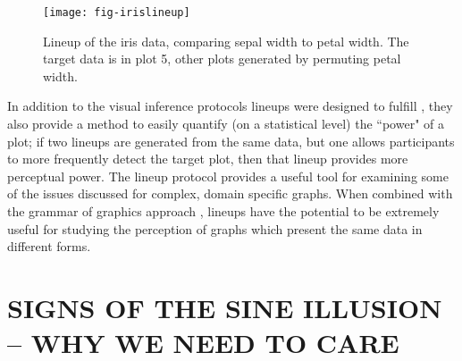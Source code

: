 \documentclass[11pt]{isuthesis}\usepackage[]{graphicx}\usepackage[]{color}
\begin{document}
\begin{figure}[htbp]\centering
\texttt{[image: fig-irislineup]}
\caption[Lineup for testing statistical graphics]{Lineup of the iris data, comparing sepal width to petal width. The target data is in plot 5, other plots generated by permuting petal width.}\label{fig:lineupexample}
\end{figure}
In addition to the visual inference protocols lineups were designed to fulfill \citep{buja2009statistical}, they also provide a method to easily quantify (on a statistical level) the ``power" of a plot; if two lineups are generated from the same data, but one allows participants to more frequently detect the target plot, then that lineup provides more perceptual power. The lineup protocol provides a useful tool for examining some of the issues discussed for complex, domain specific graphs. When combined with the grammar of graphics approach \citep{wickham2010graphical}, lineups have the potential to be extremely useful for studying the perception of graphs which present the same data in different forms.


\graphicspath{{Figure/sineIllusion/}{Images/sineIllusion/}}
\renewcommand{\floatpagefraction}{.99}

\newcommand{\range}[1]{{\text{range}\left(#1\right)}}
\newcommand{\s}[2]{{_{#1}s^{ #2}}}
\newcommand{\atan}[1]{\text{atan}\left({#1}\right)}
\newcommand{\xR}{\mathbb{R}}








\chapter{SIGNS OF THE SINE ILLUSION -- WHY WE NEED TO CARE}\label{SineIllusionChapter}\label{sineillusion}
\end{document}
